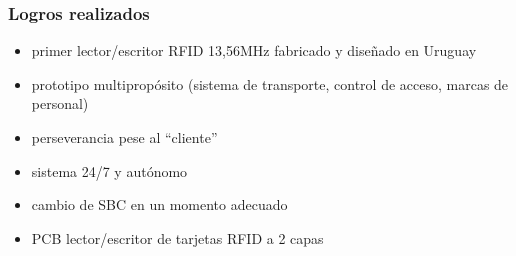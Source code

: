 \documentclass{beamer}
\begin{document}
\begin{frame}
	\frametitle{Logros realizados}
	\begin{itemize}
		\item primer lector/escritor RFID 13,56MHz fabricado y diseñado en Uruguay

		\bigskip		
		\item prototipo multipropósito (sistema de transporte, control de acceso, marcas de personal)

		\bigskip		
		\item perseverancia pese al “cliente”
		
		\bigskip		
		\item sistema 24/7 y autónomo
		
		\bigskip		
		\item cambio de SBC en un momento adecuado
		
		\bigskip		
		\item PCB lector/escritor de tarjetas RFID a 2 capas

	\end{itemize}		
\end{frame}			
\end{document}
